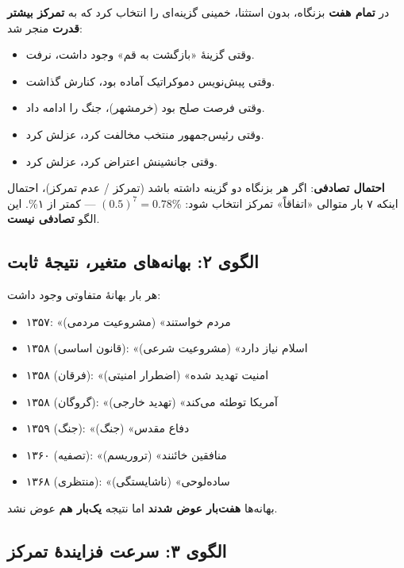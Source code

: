 \documentclass[12pt,a4paper]{book}
\newcommand{\keyword}[1]{\textbf{\textcolor{cPrimary}{#1}}}
\begin{document}
\begin{warningBox}
در \keyword{تمام هفت} بزنگاه، بدون استثنا، خمینی گزینه‌ای را انتخاب کرد که به \keyword{تمرکز بیشتر قدرت} منجر شد:

\begin{itemize}[label=\textcolor{cAccent}{$\blacktriangleright$}, rightmargin=2em]
    \item وقتی گزینهٔ «بازگشت به قم» وجود داشت، نرفت.
    \item وقتی پیش‌نویس دموکراتیک آماده بود، کنارش گذاشت.
    \item وقتی فرصت صلح بود (خرمشهر)، جنگ را ادامه داد.
    \item وقتی رئیس‌جمهور منتخب مخالفت کرد، عزلش کرد.
    \item وقتی جانشینش اعتراض کرد، عزلش کرد.
\end{itemize}

\textbf{احتمال تصادفی}: اگر هر بزنگاه دو گزینه داشته باشد (تمرکز / عدم تمرکز)، احتمال اینکه ۷ بار متوالی «اتفاقاً» تمرکز انتخاب شود: $(0.5)^7 = 0.78\%$ — کمتر از ۱\%. این الگو \keyword{تصادفی نیست}.
\end{warningBox}

\subsection{الگوی ۲: بهانه‌های متغیر، نتیجهٔ ثابت}

\begin{noteBox}
هر بار بهانهٔ متفاوتی وجود داشت:
\begin{itemize}[label=\textcolor{cGold}{$\bullet$}, rightmargin=2em]
    \item ۱۳۵۷: «مردم خواستند» (مشروعیت مردمی)
    \item ۱۳۵۸ (قانون اساسی): «اسلام نیاز دارد» (مشروعیت شرعی)
    \item ۱۳۵۸ (فرقان): «امنیت تهدید شده» (اضطرار امنیتی)
    \item ۱۳۵۸ (گروگان): «آمریکا توطئه می‌کند» (تهدید خارجی)
    \item ۱۳۵۹ (جنگ): «دفاع مقدس» (جنگ)
    \item ۱۳۶۰ (تصفیه): «منافقین خائنند» (تروریسم)
    \item ۱۳۶۸ (منتظری): «ساده‌لوحی» (ناشایستگی)
\end{itemize}

بهانه‌ها \keyword{هفت‌بار عوض شدند} اما نتیجه \keyword{یک‌بار هم} عوض نشد.
\end{noteBox}

\subsection{الگوی ۳: سرعت فزایندهٔ تمرکز}
\end{document}
